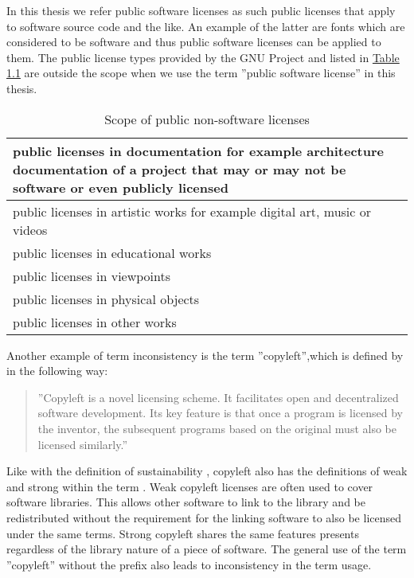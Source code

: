 In this thesis we refer public software licenses as such public licenses that apply to software source code and the like. An example of the latter are fonts which are considered to be software and thus public software licenses can be applied to them. The public license types provided by the GNU Project \citep{gnu:licenselist} and listed in \hyperref[table:non-software-licenses]{Table 1.1} are outside the scope when we use the term ''public software license'' in this thesis.
\begin{table}[t]
  \begin{center}
    \begin{tabular}{ |m{25em}| } 
      \hline
      public licenses in documentation for example architecture documentation of a project that may or may not be software or even publicly licensed \\
      \hline
      public licenses in artistic works for example digital art, music or videos \\
      \hline
      public licenses in educational works \\
      \hline
      public licenses in viewpoints \\
      \hline
      public licenses in physical objects \\
      \hline
      public licenses in other works \\
      \hline
    \end{tabular}
  \caption{Scope of public non-software licenses}
  \label{table:non-software-licenses}
  \end{center}
\end{table}

Another example of term inconsistency is the term ''copyleft'',which is defined by \citet{mustonen2003} in the following way:
\begin{quote}
	''Copyleft is a novel licensing scheme. It facilitates open and decentralized software development. Its key feature is that once a program is licensed by the inventor, the subsequent programs based on the original must also be licensed similarly.''
\end{quote}
Like with the definition of sustainability \citep{weak-sustainability}, copyleft also has the definitions of weak and strong within the term \citep{wikipedia:copyleft}. Weak copyleft licenses are often used to cover software libraries. This allows other software to link to the library and be redistributed without the requirement for the linking software to also be licensed under the same terms. Strong copyleft shares the same features \cite{mustonen2003} presents regardless of the library nature of a piece of software. The general use of the term ''copyleft'' without the prefix also leads to inconsistency in the term usage.

